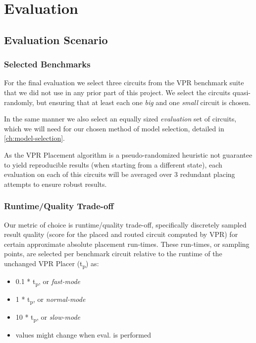 
\chapter{Evaluation}\label{ch:evaluation}
\glsresetall %

\section{Evaluation Scenario}

\subsection{Selected Benchmarks}

For the final evaluation we select three circuits from the \gls{VPR} benchmark suite that we did not use in any prior part of this project. We select the circuits quasi-randomly, but ensuring that at least each one \textit{big} and one \textit{small} circuit is chosen.

In the same manner we also select an equally sized \textit{evaluation} set of circuits, which we will need for our chosen method of model selection, detailed in \ref{ch:model-selection}.

As the \gls{VPR} Placement algorithm is a pseudo-randomized heuristic not guarantee to yield reproducible results (when starting from a different state), each evaluation on each of this circuits will be averaged over 3\cite{TODO} redundant placing attempts to ensure robust results.

\subsection{Runtime/Quality Trade-off}

Our metric of choice is runtime/quality trade-off, specifically discretely sampled result quality (score for the placed and routed circuit computed by \gls{VPR}) for certain approximate absolute placement run-times. These run-times, or sampling points, are selected per benchmark circuit relative to the runtime of the unchanged \gls{VPR} Placer (t\textsubscript{p}) as:

\begin{itemize}
	\item 0.1 * t\textsubscript{p}, or \textit{fast-mode}
	\item 1   * t\textsubscript{p}, or \textit{normal-mode}
	\item 10  * t\textsubscript{p}, or \textit{slow-mode}
	\item \cite{TODO} values might change when eval. is performed
\end{itemize}

